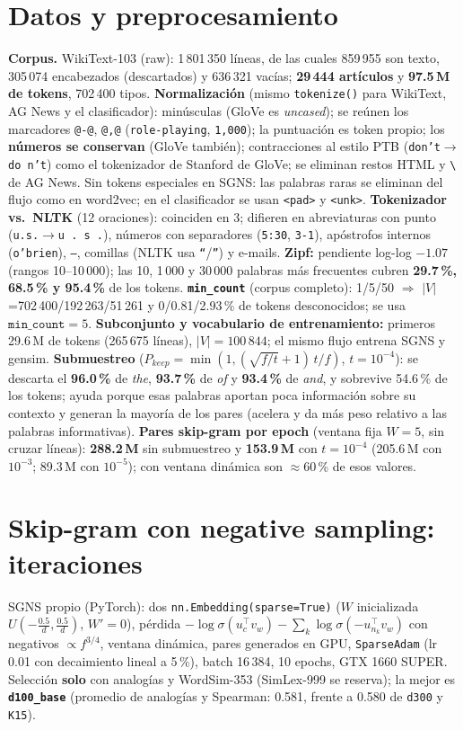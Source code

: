\documentclass[10pt,a4paper]{article}
\begin{document}
\section{Datos y preprocesamiento}
\textbf{Corpus.} WikiText-103 (raw): 1\,801\,350 líneas, de las cuales 859\,955 son texto, 305\,074 encabezados (descartados) y 636\,321 vacías; \textbf{29\,444 artículos} y \textbf{97.5\,M de tokens}, 702\,400 tipos. \textbf{Normalización} (mismo \texttt{tokenize()} para WikiText, AG News y el clasificador): minúsculas (GloVe es \textit{uncased}); se reúnen los marcadores \texttt{@-@}, \texttt{@,@} (\texttt{role-playing}, \texttt{1,000}); la puntuación es token propio; los \textbf{números se conservan} (GloVe también); contracciones al estilo PTB (\texttt{don't}$\to$\texttt{do n't}) como el tokenizador de Stanford de GloVe; se eliminan restos HTML y \texttt{\textbackslash} de AG News. Sin tokens especiales en SGNS: las palabras raras se eliminan del flujo como en word2vec; en el clasificador se usan \texttt{<pad>} y \texttt{<unk>}.
\textbf{Tokenizador vs.\ NLTK} (12 oraciones): coinciden en 3; difieren en abreviaturas con punto (\texttt{u.s.}$\to$\texttt{u . s .}), números con separadores (\texttt{5:30}, \texttt{3-1}), apóstrofos internos (\texttt{o'brien}), \texttt{--}, comillas (NLTK usa \texttt{``}/\texttt{''}) y e-mails. \textbf{Zipf:} pendiente log-log $-1.07$ (rangos 10--10\,000); las 10, 1\,000 y 30\,000 palabras más frecuentes cubren \textbf{29.7\,\%, 68.5\,\% y 95.4\,\%} de los tokens. \textbf{\texttt{min\_count}} (corpus completo): 1/5/50 $\Rightarrow$ $|V|$=702\,400/192\,263/51\,261 y 0/0.81/2.93\,\% de tokens desconocidos; se usa $\texttt{min\_count}=5$.
\textbf{Subconjunto y vocabulario de entrenamiento:} primeros 29.6\,M de tokens (265\,675 líneas), $|V|=100\,844$; el mismo flujo entrena SGNS y gensim.
\textbf{Submuestreo} ($P_{keep}=\min(1,(\sqrt{f/t}+1)\,t/f)$, $t=10^{-4}$): se descarta el \textbf{96.0\,\%} de \textit{the}, \textbf{93.7\,\%} de \textit{of} y \textbf{93.4\,\%} de \textit{and}, y sobrevive 54.6\,\% de los tokens; ayuda porque esas palabras aportan poca información sobre su contexto y generan la mayoría de los pares (acelera y da más peso relativo a las palabras informativas). \textbf{Pares skip-gram por epoch} (ventana fija $W{=}5$, sin cruzar líneas): \textbf{288.2\,M} sin submuestreo y \textbf{153.9\,M} con $t{=}10^{-4}$ (205.6\,M con $10^{-3}$; 89.3\,M con $10^{-5}$); con ventana dinámica son $\approx$60\,\% de esos valores.

\section{Skip-gram con negative sampling: iteraciones}
SGNS propio (PyTorch): dos \texttt{nn.Embedding(sparse=True)} ($W$ inicializada $U(-\tfrac{0.5}{d},\tfrac{0.5}{d})$, $W'{=}0$), pérdida $-\log\sigma(u_c^\top v_w)-\sum_{k}\log\sigma(-u_{n_k}^\top v_w)$ con negativos $\propto f^{3/4}$, ventana dinámica, pares generados en GPU, \texttt{SparseAdam} (lr 0.01 con decaimiento lineal a 5\,\%), batch 16\,384, 10 epochs, GTX 1660 SUPER. Selección \textbf{solo} con analogías y WordSim-353 (SimLex-999 se reserva); la mejor es \textbf{\texttt{d100\_base}} (promedio de analogías y Spearman: 0.581, frente a 0.580 de \texttt{d300} y \texttt{K15}).
\end{document}
